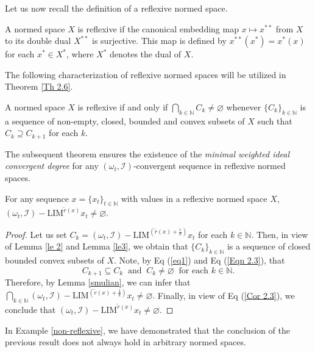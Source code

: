 \documentclass[reqno]{amsart}
\begin{document}
{Let us now recall the definition of a reflexive normed space.
\begin{definition}\cite{megginson2012introduction}
A normed space  $X$ is reflexive if the canonical embedding map $x \mapsto x^{**}$ from $X$ to its double dual $ X^{**}$ is surjective. This map is defined by $ x^{**}(x^*) = x^*(x)$ for each $x^* \in X^*$, where $X^* $ denotes the dual of $X$.
\end{definition}
The following characterization of reflexive normed spaces will be utilized in Theorem \ref{Th 2.6}.
\begin{lemma} \cite[Theorem 1.13.6]{megginson2012introduction}\label{smulian}
A normed space $X$ is reflexive if and only if  $\displaystyle\bigcap_{k\in\mathbb{N}} C_k\neq\varnothing$ whenever $\{C_k\}_{k\in\mathbb{N}}$ is a sequence of non-empty, closed, bounded and convex subsets of $X$ such that $C_k\supseteq C_{k+1}$ for each $k$.
\end{lemma}
The subsequent theorem ensures the existence of the \textit{minimal weighted ideal convergent degree} for any $(\omega_t,\mathcal{I})$-convergent sequence in reflexive normed spaces. 

\begin{theorem}\label{Th 2.6}
For any sequence $x=\{x_t\}_{t\in\mathbb{N}}$ with values in a reflexive normed space $X$,  $(\omega_t,\mathcal{I})-\text{LIM}^{\tilde{r}(x)} x_t\neq\varnothing$.
\end{theorem}

\begin{proof} 
	Let us set $C_k=(\omega_t,\mathcal{I})-\text{LIM}^{(\tilde{r}(x)+\frac{1}{k})} x_t$ for each $k\in\mathbb{N}$. Then, in view of Lemma \ref{le 2} and Lemma \ref{le3}, we obtain that $\{C_k\}_{k\in\mathbb{N}}$ is a sequence of closed bounded convex subsets of $X$.
	Note, by Eq (\ref{eq1}) and Eq (\ref{Eqn 2.3}), that
	 $$
	C_{k+1}\subseteq C_{k}~\mbox{ and }~ C_k\neq\varnothing~ \mbox{ for each } k\in\mathbb{N}.
	 $$  
	Therefore, by Lemma \ref{smulian}, we can infer that  $\displaystyle\bigcap_{k\in\mathbb{N}} (\omega_t,\mathcal{I})-\text{LIM}^{(\tilde{r}(x)+\frac{1}{k})} x_t\neq\varnothing.$ Finally, in view of Eq (\ref{Cor 2.3}), we conclude that $(\omega_t,\mathcal{I})-\text{LIM}^{\tilde{r}(x)} x_t\neq\varnothing.$
\end{proof}

In Example \ref{non-reflexive}, we have demonstrated that the conclusion of the previous result does not always hold in arbitrary normed spaces.


}
\end{document}
